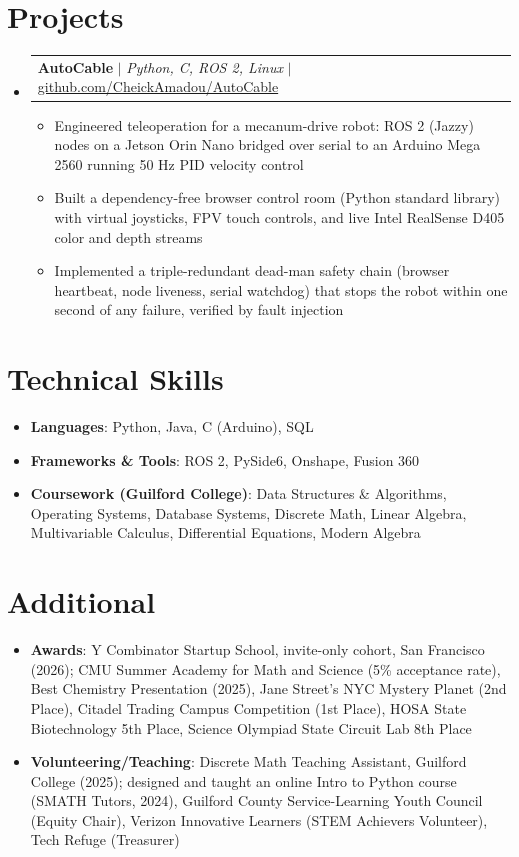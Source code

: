 \documentclass[letterpaper,11pt]{article}
\makeatletter
\newcommand{\resumeItem}[1]{
  \item\small{
    {#1 \vspace{-2pt}}
  }
}
\newcommand{\resumeProjectHeading}[2]{
    \item
    \begin{tabular*}{0.97\textwidth}{l@{\extracolsep{\fill}}r}
      \small#1 & #2 \\
    \end{tabular*}\vspace{-7pt}
}
\newcommand{\resumeSubHeadingListStart}{\begin{itemize}[leftmargin=0.15in, label={}]}
\newcommand{\resumeSubHeadingListEnd}{\end{itemize}}
\newcommand{\resumeItemListStart}{\begin{itemize}[topsep=0pt, parsep=0pt, partopsep=0pt, itemsep=0pt, leftmargin=*]}
\newcommand{\resumeItemListEnd}{\end{itemize}\vspace{-3pt}}
\makeatother
\begin{document}
\section{Projects}
  \resumeSubHeadingListStart
    \resumeProjectHeading
      {\textbf{AutoCable} $|$ \emph{Python, C, ROS 2, Linux} $|$ \href{https://github.com/CheickAmadou/AutoCable}{github.com/CheickAmadou/AutoCable}}{}
      \resumeItemListStart
        \resumeItem{Engineered teleoperation for a mecanum-drive robot: ROS 2 (Jazzy) nodes on a Jetson Orin Nano bridged over serial to an Arduino Mega 2560 running 50 Hz PID velocity control}
        \resumeItem{Built a dependency-free browser control room (Python standard library) with virtual joysticks, FPV touch controls, and live Intel RealSense D405 color and depth streams}
        \resumeItem{Implemented a triple-redundant dead-man safety chain (browser heartbeat, node liveness, serial watchdog) that stops the robot within one second of any failure, verified by fault injection}
      \resumeItemListEnd
  \resumeSubHeadingListEnd
\section{Technical Skills}
  \begin{itemize}[leftmargin=0.15in, label={}, topsep=0pt, parsep=0pt, partopsep=0pt, itemsep=1pt]
    \item \small{\textbf{Languages}{: Python, Java, C (Arduino), SQL}}
    \item \small{\textbf{Frameworks \& Tools}{: ROS 2, PySide6, Onshape, Fusion 360}}
    \item \small{\textbf{Coursework (Guilford College)}{: Data Structures \& Algorithms, Operating Systems, Database Systems, Discrete Math, Linear Algebra, Multivariable Calculus, Differential Equations, Modern Algebra}}
  \end{itemize}
  \vspace{-6pt}

\section{Additional}
  \begin{itemize}[leftmargin=0.15in, label={}, topsep=0pt, parsep=0pt, partopsep=0pt, itemsep=1pt]
    \item \small{\textbf{Awards}{: Y Combinator Startup School, invite-only cohort, San Francisco (2026); CMU Summer Academy for Math and Science (5\% acceptance rate), Best Chemistry Presentation (2025), Jane Street's NYC Mystery Planet (2nd Place), Citadel Trading Campus Competition (1st Place), HOSA State Biotechnology 5th Place, Science Olympiad State Circuit Lab 8th Place }}
    \item \small{\textbf{Volunteering/Teaching}{: Discrete Math Teaching Assistant, Guilford College (2025); designed and taught an online Intro to Python course (SMATH Tutors, 2024), Guilford County Service-Learning Youth Council (Equity Chair), Verizon Innovative Learners (STEM Achievers Volunteer), Tech Refuge (Treasurer)}}
  \end{itemize}
\end{document}
